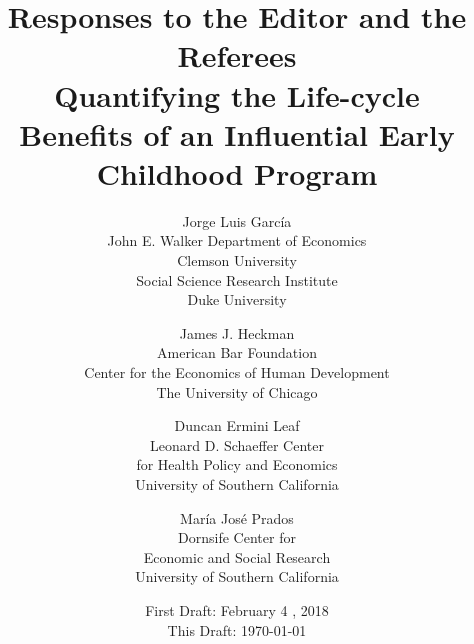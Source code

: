 

\usepackage[stable]{footmisc}

\newcommand*\leftright[2]{%
  \leavevmode
  \rlap{#1}%
  \hspace{0.5\linewidth}%
  #2}

\newcommand{\orth}{\ensuremath{\perp\!\!\!\perp}}%
\newcommand{\indep}{\orth}%
\newcommand{\notorth}{\ensuremath{\perp\!\!\!\!\!\!\diagup\!\!\!\!\!\!\perp}}%
\newcommand{\notindep}{\notorth}



\doublespacing



\singlespacing
\begin{titlepage}

\title{\Large \textbf{Responses to the Editor and the Referees \\ Quantifying the Life-cycle \\ Benefits of an Influential Early Childhood Program}}

\author{
Jorge Luis Garc\'{i}a\\
John E. Walker  Department of Economics\\
Clemson University \\
Social Science Research Institute \\
Duke University \\  \and
James J. Heckman \\
American Bar Foundation \\
Center for the Economics of Human Development \\
The University of Chicago \and
Duncan Ermini Leaf \\
Leonard D. Schaeffer Center \\  for Health Policy and Economics\\
University of Southern California \and
Mar\'{i}a Jos\'{e} Prados \\
Dornsife Center for \\ Economic and Social Research\\
University of Southern California}
\date{First Draft: February 4 , 2018\\ This Draft: \today}

\maketitle
\thispagestyle{empty}
\restoregeometry
\end{titlepage}

